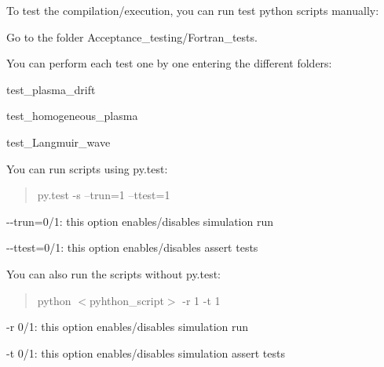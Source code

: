 To test the compilation/execution, you can run test python scripts manually\+:


\begin{DoxyItemize}
\item Go to the folder Acceptance\+\_\+testing/\+Fortran\+\_\+tests.
\item You can perform each test one by one entering the different folders\+:
\begin{DoxyItemize}
\item test\+\_\+plasma\+\_\+drift
\item test\+\_\+homogeneous\+\_\+plasma
\item test\+\_\+\+Langmuir\+\_\+wave
\end{DoxyItemize}
\item You can run scripts using py.\+test\+: \begin{quote}
py.\+test -\/s --trun=1 --ttest=1 \end{quote}

\begin{DoxyItemize}
\item {\ttfamily -\/-\/trun=0/1}\+: this option enables/disables simulation run
\item {\ttfamily -\/-\/ttest=0/1}\+: this option enables/disables assert tests
\end{DoxyItemize}
\item You can also run the scripts without py.\+test\+: \begin{quote}
python $<$pyhthon\+\_\+script$>$ -\/r 1 -\/t 1 \end{quote}

\begin{DoxyItemize}
\item {\ttfamily -\/r 0/1}\+: this option enables/disables simulation run
\item {\ttfamily -\/t 0/1}\+: this option enables/disables simulation assert tests 
\end{DoxyItemize}
\end{DoxyItemize}
